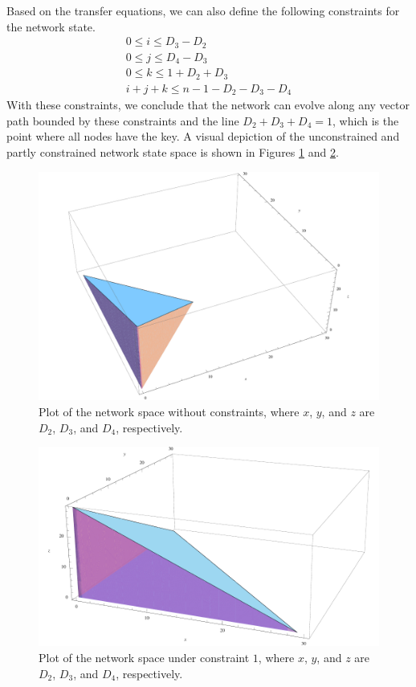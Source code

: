 \documentclass[a4paper,10pt]{article}
\begin{document}
Based on the transfer equations, we can also define the following constraints for the network state.
\begin{align}
0 \leq i \leq D_3 - D_2 \\
0 \leq j \leq D_4 - D_3 \\
0 \leq k \leq 1 + D_2 + D_3 \\
i + j + k \leq n - 1 - D_2 - D_3 - D_4
\end{align}
With these constraints, we conclude that the network can evolve along any vector path bounded by these
constraints and the line $D_2 + D_3 + D_4 = 1$, which is the point where all nodes have the key. A visual 
depiction of the unconstrained and partly constrained network state space is shown in Figures \ref{fig:unconstrained} 
and \ref{fig:constrained}.

\begin{figure}[ht!]
\begin{center}
\includegraphics[width=5in]{constrained_plot.pdf}
\end{center}
\label{fig:unconstrained}
\caption{Plot of the network space without constraints, where $x$, $y$, and $z$ are $D_2$, $D_3$, and $D_4$, respectively.}
\end{figure}

\begin{figure}[ht!]
\begin{center}
\includegraphics[width=5in]{unconstrained_plot.pdf}
\end{center}
\label{fig:constrained}
\caption{Plot of the network space under constraint $1$, where $x$, $y$, and $z$ are $D_2$, $D_3$, and $D_4$, respectively.}
\end{figure}
\end{document}
